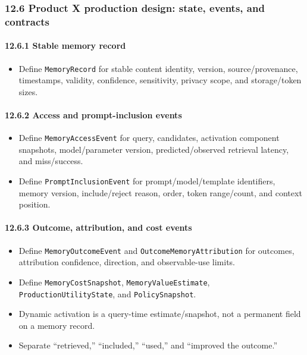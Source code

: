 \subsubsection{12.6 Product X production design: state, events, and contracts}\label{126-product-x-production-design-state-events-and-contracts}

\paragraph{12.6.1 Stable memory record}\label{1261-stable-memory-record}

\begin{itemize}
\tightlist
\item
  Define \texttt{MemoryRecord} for stable content identity, version, source/provenance, timestamps, validity, confidence, sensitivity, privacy scope, and storage/token sizes.
\end{itemize}

\paragraph{12.6.2 Access and prompt-inclusion events}\label{1262-access-and-prompt-inclusion-events}

\begin{itemize}
\tightlist
\item
  Define \texttt{MemoryAccessEvent} for query, candidates, activation component snapshots, model/parameter version, predicted/observed retrieval latency, and miss/success.
\item
  Define \texttt{PromptInclusionEvent} for prompt/model/template identifiers, memory version, include/reject reason, order, token range/count, and context position.
\end{itemize}

\paragraph{12.6.3 Outcome, attribution, and cost events}\label{1263-outcome-attribution-and-cost-events}

\begin{itemize}
\tightlist
\item
  Define \texttt{MemoryOutcomeEvent} and \texttt{OutcomeMemoryAttribution} for outcomes, attribution confidence, direction, and observable-use limits.
\item
  Define \texttt{MemoryCostSnapshot}, \texttt{MemoryValueEstimate}, \texttt{ProductionUtilityState}, and \texttt{PolicySnapshot}.
\item
  Dynamic activation is a query-time estimate/snapshot, not a permanent field on a memory record.
\item
  Separate ``retrieved,'' ``included,'' ``used,'' and ``improved the outcome.''
\end{itemize}


